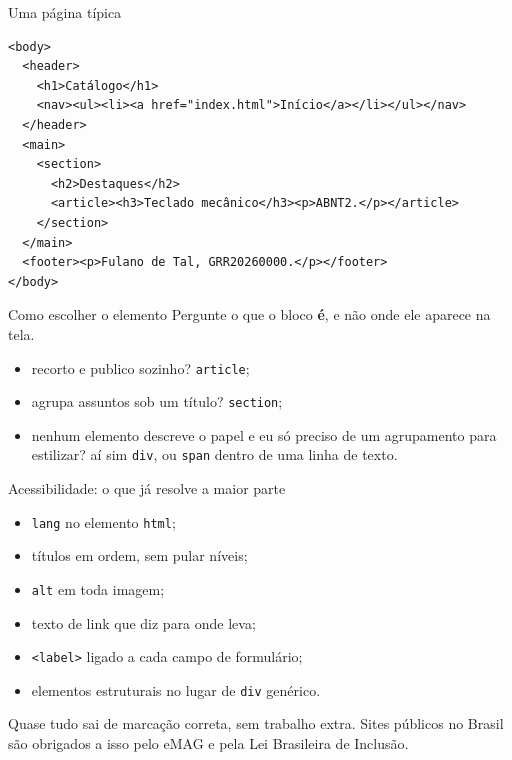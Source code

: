 \documentclass{beamer}
\begin{document}
\begin{frame}[fragile]{Uma página típica}
  \begin{verbatim}
<body>
  <header>
    <h1>Catálogo</h1>
    <nav><ul><li><a href="index.html">Início</a></li></ul></nav>
  </header>
  <main>
    <section>
      <h2>Destaques</h2>
      <article><h3>Teclado mecânico</h3><p>ABNT2.</p></article>
    </section>
  </main>
  <footer><p>Fulano de Tal, GRR20260000.</p></footer>
</body>
  \end{verbatim}
\end{frame}

\begin{frame}{Como escolher o elemento}
  Pergunte o que o bloco \textbf{é}, e não onde ele aparece na tela.

  \vspace{0.4cm}
  \begin{itemize}
    \item recorto e publico sozinho? \texttt{article};
    \item agrupa assuntos sob um título? \texttt{section};
    \item nenhum elemento descreve o papel e eu só preciso de um agrupamento
          para estilizar? aí sim \texttt{div}, ou \texttt{span} dentro de uma
          linha de texto.
  \end{itemize}
\end{frame}

\begin{frame}{Acessibilidade: o que já resolve a maior parte}
  \begin{itemize}
    \item \texttt{lang} no elemento \texttt{html};
    \item títulos em ordem, sem pular níveis;
    \item \texttt{alt} em toda imagem;
    \item texto de link que diz para onde leva;
    \item \texttt{<label>} ligado a cada campo de formulário;
    \item elementos estruturais no lugar de \texttt{div} genérico.
  \end{itemize}

  \vspace{0.4cm}
  Quase tudo sai de marcação correta, sem trabalho extra. Sites públicos no
  Brasil são obrigados a isso pelo eMAG e pela Lei Brasileira de Inclusão.
\end{frame}
\end{document}
